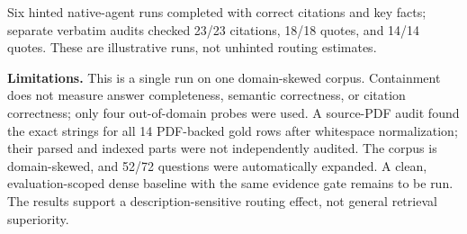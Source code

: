 Six hinted native-agent runs completed with correct citations and key
facts; separate verbatim audits checked 23/23 citations, 18/18 quotes,
and 14/14 quotes. These are illustrative runs, not unhinted routing
estimates.

\textbf{Limitations.}
This is a single run on one domain-skewed corpus. Containment does not
measure answer completeness, semantic correctness, or citation
correctness; only four out-of-domain probes were used. A source-PDF audit
found the exact strings for all 14 PDF-backed gold rows after whitespace
normalization; their parsed and indexed parts were not independently
audited. The corpus is domain-skewed, and 52/72 questions were
automatically expanded. A clean, evaluation-scoped dense baseline with
the same evidence gate remains to be run. The results support a
description-sensitive routing effect, not general retrieval superiority.
